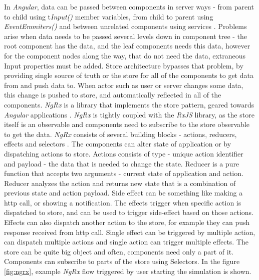 In \textit{Angular}, data can be passed between components in server ways - from parent to child using t\textit{Input()} member variables, from child to parent using \textit{EventEmmiters()} and between unrelated components using services \cite{AngularPassingData}. Problems arise when data needs to be passed several levels down in component tree - the root component has the data, and the leaf components needs this data, however for the component nodes along the way, that do not need the data, extraneous Input properties must be added. Store architecture bypasses that problem, by providing single source of truth or the store for all of the components to get data from and push data to. When actor such as user or server changes some data, this change is pushed to store, and automatically reflected in all of the components.
\textit{NgRx} is a library that implements the store pattern, geared towards \textit{Angular} applications \cite{NgrxDocs}. \textit{NgRx} is tightly coupled with the \textit{RxJS} library, as the store itself is an observable and components need to subscribe to the store observable to get the data.
\textit{NgRx} consists of several building blocks - actions, reducers, effects and selectors \cite{NgRxStoreDocs}. The components can alter state of application or by dispatching actions to store. Actions consists of type - unique action identifier and payload - the data that is needed to change the state. Reducer is a pure function that accepts two arguments - current state of application and action. Reducer analyzes the action and returns new state that is a combination of previous state and action payload. Side effect can be something like making a http call, or showing a notification. The effects trigger when specific action is dispatched to store, and can be used to trigger side-effect based on those actions. Effects can also dispatch another action to the store, for example they can push response received from http call. Single effect can be triggered by multiple action, can dispatch multiple actions and single action can trigger multiple effects. The store can be quite big object and often, components need only a part of it. Components can subscribe to parts of the store using Selectors. In the figure \ref{fig:ngrx}, example \textit{NgRx} flow triggered by user starting the simulation is shown.

